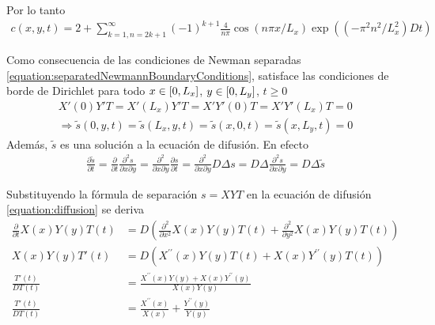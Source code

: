 \documentclass{article}
\newcommand{\leftOpenInterval}{\left]}
\newcommand{\rightOpenInterval}{\right[}
\newcommand{\leftClosedInterval}{\left[}
\newcommand{\rightClosedInterval}{\right]}
\newcommand{\interval}[3]{%
  \ifstrequal{#1}{oo}{%
    \leftOpenInterval #2, #3 \rightOpenInterval%
  }{%
    \ifstrequal{#1}{co}{%
      \leftClosedInterval #2, #3 \rightOpenInterval%
    }{%
      \ifstrequal{#1}{oc}{
        \leftOpenInterval #2, #3 \rightClosedInterval%
      }{%
        \ifstrequal{#1}{cc}{
          \leftClosedInterval #2, #3 \rightClosedInterval
        }{%
        }%
      }%
    }%
  }%
}
\begin{document}
  Por lo tanto
  \begin{align}
    c(x, y, t)
    =
    2
    +
    \sum_{k = 1, n = 2 k + 1}^{\infty}
    (-1)^{k + 1}
    \frac{4}{n \pi}
    \cos(n \pi x / L_x) \exp((- \pi^2 n^2 / L_x^2) D t)
  \end{align}



  \newpage
  Como consecuencia de las condiciones de Newman separadas \eqref{equation:separatedNewmannBoundaryConditions}, satisface las condiciones de borde de Dirichlet para todo \(x \in \interval{cc}{0}{L_x}\), \(y \in \interval{cc}{0}{L_y}\), \(t \geq 0\)
  \begin{align}
    X'(0) Y' T
    =
    X'(L_x) Y' T
    =
    X' Y'(0) T
    =
    X' Y'(L_x) T
    =
    0
    \\
    \Rightarrow
    \label{equation:tildeDirichletBoundaryConditions}
    \tilde{s}(0, y, t)
    =
    \tilde{s}(L_x, y, t)
    =
    \tilde{s}(x, 0, t)
    =
    \tilde{s}(x, L_y, t)
    =
    0
  \end{align}
  Además, \(\tilde{s}\) es una solución a la ecuación de difusión.
  En efecto
  \begin{align}
    \label{equation:tildeDifussion}
    \frac{\partial \tilde{s}}{\partial t}
    =
    \frac{\partial}{\partial t} \frac{\partial^2 s}{\partial x \partial y}
    =
    \frac{\partial^2}{\partial x \partial y} \frac{\partial s}{\partial t}
    =
    \frac{\partial^2}{\partial x \partial y} D \Delta s
    =
    D \Delta \frac{\partial^2 s}{\partial x \partial y}
    =
    D \Delta \tilde{s}
  \end{align}

  Substituyendo la fórmula de separación \(s = X Y T\) en la ecuación de difusión \eqref{equation:diffusion} se deriva
  \begin{align}
    \frac{\partial}{\partial t} X(x) Y(y) T(t)
    &=
    D \left(
      \frac{\partial^2}{\partial x^2} X(x) Y(y) T(t)
      +
      \frac{\partial^2}{\partial y^2} X(x) Y(y) T(t)
    \right)
    \\
    X(x) Y(y) T'(t)
    &=
    D \left(
      X^{\prime\prime}(x) Y(y) T(t)
      +
      X(x) Y^{\prime\prime}(y) T(t)
    \right)
    \\
    \frac{T'(t)}{D T(t)}
    &=
    \frac{X^{\prime\prime}(x) Y(y) + X(x) Y^{\prime\prime}(y)}{X(x) Y(y)}
    \\
    \label{equation:separatedDifferentialEquation}
    \frac{T'(t)}{D T(t)}
    &=
    \frac{X^{\prime\prime}(x)}{X(x)}
    +
    \frac{Y^{\prime\prime}(y)}{Y(y)}
  \end{align}
  
\end{document}
